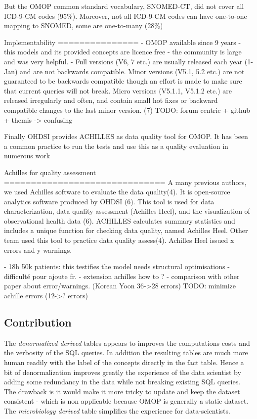 But the OMOP common standard vocabulary, SNOMED-CT, did not cover all ICD-9-CM
codes (95\%). Moreover, not all ICD-9-CM codes can have one-to-one mapping to
SNOMED, some are one-to-many (28\%)\cite{snomed-icd9}
 
Implementability
===============
- OMOP available since 9 years
- this models and its provided concepts are licence free
- the community is large and was very helpful.
- Full versions (V6, 7 etc.) are usually released each year (1-Jan) and are not backwards compatible. 
Minor versions (V5.1, 5.2 etc.) are not guaranteed to be backwards compatible though an effort is made to make sure that current queries will not break. 
Micro versions (V5.1.1, V5.1.2 etc.) are released irregularly and often, and contain small hot fixes or backward compatible changes to the last minor version.
(7)
TODO: forum centric + github + themis -> confusing


Finally OHDSI provides ACHILLES as data quality tool for OMOP. It has been a
common practice to run the tests and use this as a quality evaluation in
numerous work \cite{achilles-papers}

Achilles for quality assessment
==============================
A many previous authors, we used Achilles software to evaluate the data
quality(4). It is open-source analytics software produced by OHDSI (6).  This
tool is used for data characterization, data quality assessment (Achilles
Heel), and the visualization of observational health data (6).  ACHILLES
calculates summary statistics and includes a unique function for checking data
quality, named Achilles Heel. 
Other team used this tool to practice data quality assess(4).
Achilles Heel issued x errors and y warnings.

- 18h 50k patients: this testifies the model needs structural optimisations
- difficulté pour ajoute fr. 
- extension achilles how to ?
- comparison with other paper about error/warnings. (Korean Yoon 36->28 errors)
TODO: minimize achille errors  (12->? errors)

\subsection{Contribution}

The \emph{denormalized derived} tables appears to improves the computations
costs and the verbosity of the SQL queries. In addition the resulting tables
are much more human readily with the label of the concepts directly in the fact
table. Hence a bit of denormalization improves greatly the experience of the
data scientist by adding some redundancy in the data while not breaking
existing SQL queries. The drawback is it would make it more tricky to update
and keep the dataset consistent - which is non applicable because OMOP is
generally a static dataset.
The \emph{microbiology derived} table simplifies the experience for
data-scientists.

